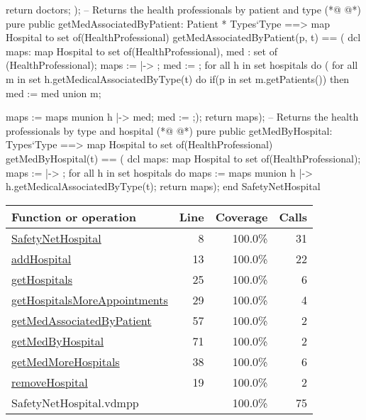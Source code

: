 \begin{vdmpp}[breaklines=true]
                  return doctors;
                 );
 -- Returns the health professionals by patient and type                              
(*@
\label{getMedAssociatedByPatient:57}
@*)
 pure public getMedAssociatedByPatient: Patient * Types`Type ==> map Hospital to set of(HealthProfessional)
  getMedAssociatedByPatient(p, t) == (
                     dcl maps: map Hospital to set of(HealthProfessional), med : set of (HealthProfessional);
                     maps := { |-> };
                     med := {};
                     for all h in set hospitals do (
                      for all m in set h.getMedicalAssociatedByType(t) do
                       if(p in set m.getPatients())
                        then med := med union {m};
                       
                      maps := maps munion {h |-> med};
                      med := {};);
                      return maps);
 -- Returns the health professionals by type and hospital
(*@
\label{getMedByHospital:71}
@*)
 pure public getMedByHospital: Types`Type ==> map Hospital to set of(HealthProfessional)
  getMedByHospital(t) == (
                     dcl maps: map Hospital to set of(HealthProfessional);
                     maps := { |-> };
                     for all h in set hospitals do
                      maps := maps munion {h |-> h.getMedicalAssociatedByType(t)};
                     return maps);
end SafetyNetHospital
\end{vdmpp}
\bigskip
\begin{longtable}{|l|r|r|r|}
\hline
Function or operation & Line & Coverage & Calls \\
\hline
\hline
\hyperref[SafetyNetHospital:8]{SafetyNetHospital} & 8&100.0\% & 31 \\
\hline
\hyperref[addHospital:13]{addHospital} & 13&100.0\% & 22 \\
\hline
\hyperref[getHospitals:25]{getHospitals} & 25&100.0\% & 6 \\
\hline
\hyperref[getHospitalsMoreAppointments:29]{getHospitalsMoreAppointments} & 29&100.0\% & 4 \\
\hline
\hyperref[getMedAssociatedByPatient:57]{getMedAssociatedByPatient} & 57&100.0\% & 2 \\
\hline
\hyperref[getMedByHospital:71]{getMedByHospital} & 71&100.0\% & 2 \\
\hline
\hyperref[getMedMoreHospitals:38]{getMedMoreHospitals} & 38&100.0\% & 6 \\
\hline
\hyperref[removeHospital:19]{removeHospital} & 19&100.0\% & 2 \\
\hline
\hline
SafetyNetHospital.vdmpp & & 100.0\% & 75 \\
\hline
\end{longtable}

